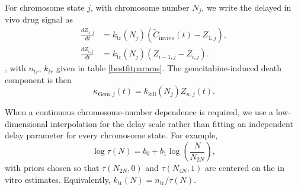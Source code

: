 \documentclass[11pt,notitlepage]{article}
\begin{document}
For chromosome state \(j\), with chromosome number \(N_j\), we write the delayed in vivo drug signal as
\begin{align}
\frac{dZ_{1,j}}{dt}
&=
k_{\mathrm{tr}}(N_j)
\left(
\widetilde C_{\mathrm{in vivo}}(t)-Z_{1,j}
\right),\\
\frac{dZ_{i,j}}{dt}
&=
k_{\mathrm{tr}}(N_j)
\left(
Z_{i-1,j}-Z_{i,j}
\right).
\end{align}
, with $n_{tr}$, $k_{tr}$ given in table \ref{bestfitparams}. The gemcitabine-induced death component is then
\begin{equation}
\kappa_{\mathrm{Gem},j}(t)
=
k_{\mathrm{kill}}(N_j) Z_{n,j}(t).
\end{equation}


When a continuous chromosome-number dependence is required, we use a low-dimensional interpolation for the delay scale rather than fitting an independent delay parameter for every chromosome state. For example,
\begin{equation}
\log \tau(N)
=
b_0
+
b_1\log\left(\frac{N}{N_{2N}}\right),
\end{equation}
with priors chosen so that \(\tau(N_{2N},0)\) and \(\tau(N_{4N},1)\) are centered on the in vitro estimates. Equivalently, \(k_{\mathrm{tr}}(N)=n_{\mathrm{tr}}/\tau(N)\).


\color{black}
\end{document}
